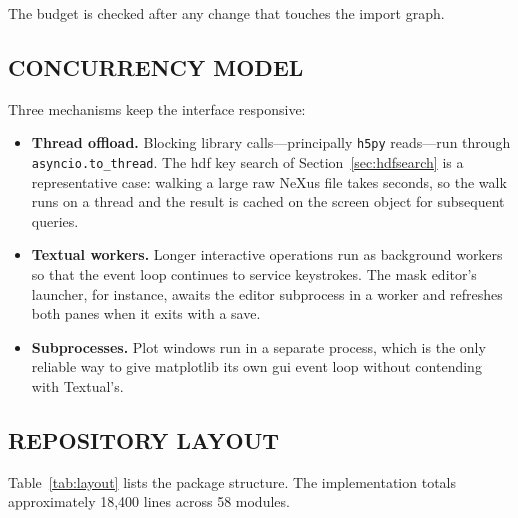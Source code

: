 \documentclass[tm]{ornltm}
\begin{document}
The budget is checked after any change that touches the import graph.

\subsection{CONCURRENCY MODEL}

Three mechanisms keep the interface responsive:

\begin{itemize}
  \item \textbf{Thread offload.} Blocking library calls---principally
    \texttt{h5py} reads---run through \texttt{asyncio.to\_thread}. The \ac{hdf}
    key search of Section~\ref{sec:hdfsearch} is a representative case: walking a
    large raw NeXus file takes seconds, so the walk runs on a thread and the
    result is cached on the screen object for subsequent queries.
  \item \textbf{Textual workers.} Longer interactive operations run as
    background workers so that the event loop continues to service keystrokes.
    The mask editor's launcher, for instance, awaits the editor subprocess in a
    worker and refreshes both panes when it exits with a save.
  \item \textbf{Subprocesses.} Plot windows run in a separate process, which
    is the only reliable way to give matplotlib its own \ac{gui} event loop
    without contending with Textual's.
\end{itemize}

\subsection{REPOSITORY LAYOUT}

Table~\ref{tab:layout} lists the package structure. The implementation totals
approximately 18,400 lines across 58 modules.
\end{document}
